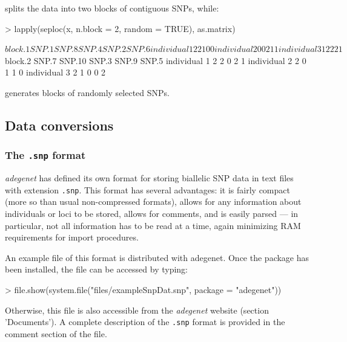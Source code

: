 \documentclass{article}
\begin{document}
splits the data into two blocks of contiguous SNPs, while:
\begin{Schunk}
\begin{Sinput}
> lapply(seploc(x, n.block = 2, random = TRUE), as.matrix)
\end{Sinput}
\begin{Soutput}
$block.1
             SNP.1 SNP.8 SNP.4 SNP.2 SNP.6
individual 1     2     2     1     0     0
individual 2     0     0     2     1     1
individual 3     1     2     2     2     1

$block.2
             SNP.7 SNP.10 SNP.3 SNP.9 SNP.5
individual 1     2      2     0     2     1
individual 2     2      0     1     1     0
individual 3     2      1     0     0     2
\end{Soutput}
\end{Schunk}
generates blocks of randomly selected SNPs.




\subsection{Data conversions}

\subsubsection{The \texttt{.snp} format}

\textit{adegenet} has defined its own format for storing biallelic SNP data in text files with
extension \texttt{.snp}.
This format has several advantages: it is fairly compact (more so than usual non-compressed
formats), allows for any information about individuals or loci to be stored, allows for comments,
and is easily parsed --- in particular, not all information has to be read at a time, again
minimizing RAM requirements for import procedures.


An example file of this format is distributed with adegenet.
Once the package has been installed, the file can be accessed by typing:
\begin{Schunk}
\begin{Sinput}
> file.show(system.file("files/exampleSnpDat.snp", package = "adegenet"))
\end{Sinput}
\end{Schunk}
Otherwise, this file is also accessible from the \textit{adegenet} website (section 'Documents').
A complete description of the \texttt{.snp} format is provided in the comment section of the file.
\\
\end{document}
